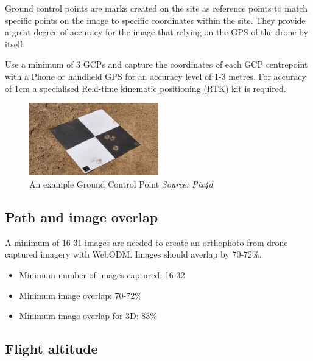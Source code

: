 \documentclass[
  a4paper,
  onecolumn,
  oneside]{book}
\providecommand{\tightlist}{%
  \setlength{\itemsep}{0pt}\setlength{\parskip}{0pt}}\usepackage{longtable,booktabs,array}
\begin{document}
Ground control points are marks created on the site as reference points
to match specific points on the image to specific coordinates within the
site. They provide a great degree of accuracy for the image that relying
on the GPS of the drone by itself.

Use a minimum of 3 GCPs and capture the coordinates of each GCP
centrepoint with a Phone or handheld GPS for an accuracy level of 1-3
metres. For accuracy of 1cm a specialised
\href{https://emlid.com/gcps-for-drone-mapping/}{Real-time kinematic
positioning (RTK)} kit is required.

\begin{figure}

{\centering \includegraphics[width=0.5\textwidth,height=\textheight]{part2/images/gcp.jpg}

}

\caption{An example Ground Control Point \emph{Source: Pix4d}}

\end{figure}

\hypertarget{path-and-image-overlap}{%
\subsection{Path and image overlap}\label{path-and-image-overlap}}

A minimum of 16-31 images are needed to create an orthophoto from drone
captured imagery with WebODM. Images should averlap by 70-72\%.

\begin{itemize}
\tightlist
\item
  Minimum number of images captured: 16-32
\item
  Minimum image overlap: 70-72\%
\item
  Minimum image overlap for 3D: 83\%
\end{itemize}

\hypertarget{flight-altitude}{%
\subsection{Flight altitude}\label{flight-altitude}}
\end{document}

